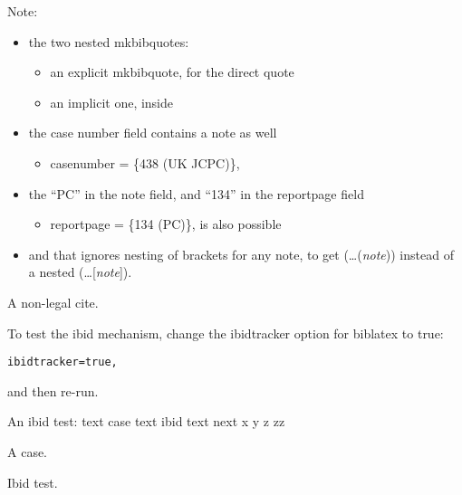 \bigskip
{}

\bigskip
\p Note:
\begin{itemize}
\item the two nested mkbibquotes:
		\begin{itemize}
		\item an explicit mkbibquote, for the direct quote
		\item an implicit one, inside 
		\end{itemize}
\item the case number field contains a note as well 
		\begin{itemize}
		\item {\ttfamily casenumber = \{438 (UK JCPC)\},}
		\end{itemize}
\item the ``PC'' in the note field, and ``134'' in the reportpage field	
		\begin{itemize}
		\item {\ttfamily reportpage = \{134 (PC)\},} is also possible
		\end{itemize}
		\item and that  ignores nesting of brackets for any note, to get (\ldots (\textit{note})) instead of a nested (\ldots [\textit{note}]).
\end{itemize}

\p A non-legal cite\autocite{westfahl:space}. 

\p To test the ibid mechanism, change the ibidtracker option for biblatex to true:
\begin{verbatim}ibidtracker=true,\end{verbatim} and then re-run.

\p An ibid test: text case text ibid text next
x
y
z
zz



\newpage

\bigskip
\p A case.


\p Ibid test.

